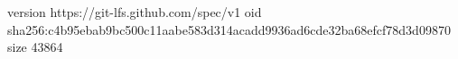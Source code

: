 version https://git-lfs.github.com/spec/v1
oid sha256:c4b95ebab9bc500c11aabe583d314acadd9936ad6cde32ba68efcf78d3d09870
size 43864
